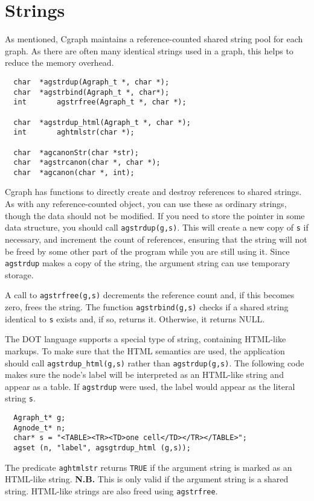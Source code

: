 \documentclass[11pt,letterpaper]{article}
\begin{document}
\section{Strings}
\label{sec:strings}
As mentioned, Cgraph maintains a reference-counted shared string pool for each graph.  
As there are often many identical strings used in a graph, this helps to reduce the
memory overhead. 
\begin{verbatim}
  char	*agstrdup(Agraph_t *, char *);
  char	*agstrbind(Agraph_t *, char*);
  int		agstrfree(Agraph_t *, char *);

  char	*agstrdup_html(Agraph_t *, char *);
  int		aghtmlstr(char *);
  
  char	*agcanonStr(char *str);
  char	*agstrcanon(char *, char *);
  char	*agcanon(char *, int);
\end{verbatim}
Cgraph has functions to directly create and destroy references to shared strings.
As with any reference-counted object, you can use these as ordinary
strings, though the data should not be modified. If you need to store the pointer
in some data structure, you should call \verb"agstrdup(g,s)". This will create a 
new copy of \verb"s" if necessary, and increment
the count of references, ensuring that the string will not be freed by some
other part of the program while you are still using it. Since  \verb"agstrdup" makes
a copy of the string, the argument string can use temporary storage.

A call to \verb"agstrfree(g,s)" decrements the reference count and, if this becomes
zero, frees the string.
The function \verb"agstrbind(g,s)" checks if a shared string identical to \verb"s" exists
and, if so, returns it. Otherwise, it returns NULL.

The DOT language supports a special type of string, containing HTML-like markups. To make
sure that the HTML semantics are used, the application should call \verb"agstrdup_html(g,s)"
rather than \verb"agstrdup(g,s)". The following code makes sure the node's label will be
interpreted as an HTML-like string and appear as a table. If \verb"agstrdup" were used,
the label would appear as the literal string \verb"s".
\begin{verbatim}
  Agraph_t* g;
  Agnode_t* n;
  char* s = "<TABLE><TR><TD>one cell</TD></TR></TABLE>";
  agset (n, "label", agsgtrdup_html (g,s));
\end{verbatim}
The predicate \verb"aghtmlstr" returns \verb"TRUE" if the argument string is marked as an
HTML-like string. {\bf N.B.} This is only valid if the argument string is a shared string.
HTML-like strings are also freed using \verb"agstrfree".
\end{document}
